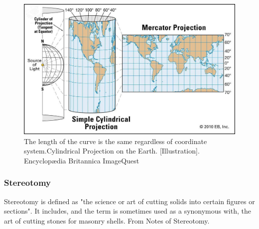 \begin{figure}[H]
\centering
\includegraphics[width=0.9\linewidth ]{figure/Introduction/Mercator.jpg}
\caption{The length of the curve is the same regardless of coordinate system.Cylindrical Projection on the Earth. [Illustration]. Encyclopædia Britannica ImageQuest}
\end{figure}



\subsubsection{Stereotomy }
  
Stereotomy is defined as "the science or art of cutting solids into certain figures or sections". It includes, and the term is sometimes used as a synonymous with, the art of cutting stones for masonry shells. From Notes of Stereotomy.

